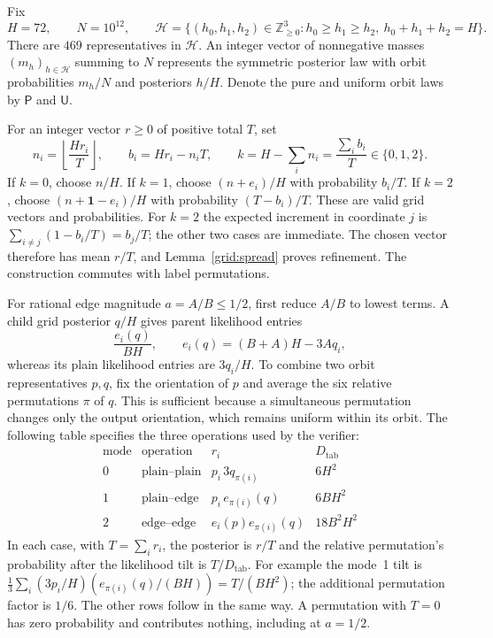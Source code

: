 Fix
\[
 H=72,\qquad N=10^{12},\qquad
 \mathcal H=\{(h_0,h_1,h_2)\in\mathbb Z_{\geq0}^3:
     h_0\geq h_1\geq h_2,\ h_0+h_1+h_2=H\}.
\]
There are $469$ representatives in $\mathcal H$.  An integer vector of
nonnegative masses $(m_h)_{h\in\mathcal H}$ summing to $N$ represents the
symmetric posterior law with orbit probabilities $m_h/N$ and posteriors
$h/H$.  Denote the pure and uniform orbit laws by $\mathsf P$ and
$\mathsf U$.

For an integer vector $r\geq0$ of positive total $T$, set
\[
 n_i=\left\lfloor\frac{Hr_i}{T}\right\rfloor,\qquad
 b_i=Hr_i-n_iT,\qquad
 k=H-\sum_i n_i=\frac{\sum_i b_i}{T}\in\{0,1,2\}.
\]
If $k=0$, choose $n/H$.  If $k=1$, choose $(n+e_i)/H$ with probability
$b_i/T$.  If $k=2$, choose $(n+\mathbf1-e_i)/H$ with probability
$(T-b_i)/T$.  These are valid grid vectors and probabilities.  For
$k=2$ the expected increment in coordinate $j$ is
$\sum_{i\ne j}(1-b_i/T)=b_j/T$; the other two cases are immediate.
The chosen vector therefore has mean $r/T$, and Lemma~\ref{grid:spread}
proves refinement.  The construction commutes with label permutations.

For rational edge magnitude $a=A/B\leq1/2$, first reduce $A/B$ to lowest
terms.  A child grid posterior $q/H$ gives parent likelihood entries
\[
 \frac{e_i(q)}{BH},\qquad e_i(q)=(B+A)H-3Aq_i,
\]
whereas its plain likelihood entries are $3q_i/H$.  To combine two
orbit representatives $p,q$, fix the orientation of $p$ and average the
six relative permutations $\pi$ of $q$.  This is sufficient because a
simultaneous permutation changes only the output orientation, which
remains uniform within its orbit.  The following table specifies the
three operations used by the verifier:
\begin{equation}
\begin{array}{c|c|c|c}
 \text{mode}&\text{operation}&r_i&D_{\mathrm{tab}}\\ \hline
 0&\text{plain--plain}&p_i\,3q_{\pi(i)}&6H^2\\
 1&\text{plain--edge}&p_i\,e_{\pi(i)}(q)&6BH^2\\
 2&\text{edge--edge}&e_i(p)e_{\pi(i)}(q)&18B^2H^2
\end{array}
\label{grid:modes}
\end{equation}
In each case, with $T=\sum_i r_i$, the posterior is $r/T$ and the
relative permutation's probability after the likelihood tilt is
$T/D_{\mathrm{tab}}$.  For example the mode~1 tilt is
$\frac13\sum_i(3p_i/H)(e_{\pi(i)}(q)/(BH))=T/(BH^2)$;
the additional permutation factor is $1/6$.  The other rows follow
in the same way.  A permutation with $T=0$ has zero probability and
contributes nothing, including at $a=1/2$.


